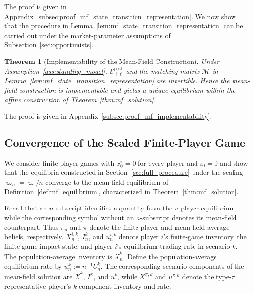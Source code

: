 \documentclass[12pt]{article}
\numberwithin{equation}{section}
\newtheorem{theorem}{Theorem}[section]
\theoremstyle{definition}
\begin{document}
The proof is given in
Appendix~\ref{subsec:proof_mf_state_transition_representation}. We now show that the procedure in
Lemma~\ref{lem:mf_state_transition_representation} can be carried out under the
market-parameter assumptions of Subsection~\ref{sec:opportunists}.

\begin{theorem}[Implementability of the Mean-Field Construction]
\label{thm:mf_implementability}
Under Assumption~\ref{ass:standing_model},
\(\mathcal E^{\mathrm{post}}_{\ell\ell}\) and the matching matrix
\(\mathcal M\) in
Lemma~\ref{lem:mf_state_transition_representation} are
invertible. Hence the mean-field construction is implementable and yields a
unique equilibrium within the affine construction of
Theorem~\ref{thm:mf_solution}.
\end{theorem}

The proof is given in
Appendix~\ref{subsec:proof_mf_implementability}.

\subsection{Convergence of the Scaled Finite-Player Game}

We consider finite-player games with \(x_0^i=0\) for every player and
\(\iota_0=0\) and show that the equilibria constructed in
Section~\ref{sec:full_procedure} under the scaling \(\varpi_n=\varpi/n\) converge to
the mean-field equilibrium of Definition~\ref{def:mf_equilibrium},
characterized in Theorem~\ref{thm:mf_solution}.

Recall that an \(n\)-subscript identifies a quantity from the \(n\)-player
equilibrium, while the corresponding symbol without an \(n\)-subscript denotes
its mean-field counterpart. Thus \(\bar\pi_n\) and \(\bar\pi\) denote the
finite-player and mean-field average beliefs, respectively.
\(X_n^{i,k}\), \(I_n^k\), and \(u_n^{i,k}\) denote player \(i\)'s finite-game
inventory, the finite-game impact state, and player \(i\)'s equilibrium trading
rate in scenario \(k\). The population-average inventory is \(\bar X_n^k\). Define the
population-average equilibrium rate by
\(\bar u_n^k:=n^{-1}U_n^k\).
The corresponding scenario components of the mean-field solution
 are \(\bar X^k\), \(I^k\), and \(\bar u^k\),
while \(X^{\pi,k}\) and \(u^{\pi,k}\) denote the type-\(\pi\)
representative player's \(k\)-component inventory and rate.
\end{document}
